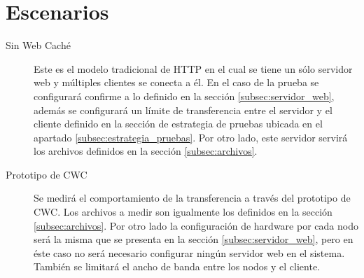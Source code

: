 \section{Escenarios}
\label{sec:escenarios}

\begin{description}
\item[Sin Web Caché] Este es el modelo tradicional de HTTP en el cual se tiene un sólo servidor web y múltiples clientes se conecta a él. En el caso de la prueba se configurará confirme a lo definido en la sección \ref{subsec:servidor_web}, además se configurará un límite de transferencia entre el servidor y el cliente definido en la sección de estrategia de pruebas ubicada en el apartado \ref{subsec:estrategia_pruebas}. Por otro lado, este servidor servirá los archivos definidos en la sección \ref{subsec:archivos}.

\item [Prototipo de CWC] Se medirá el comportamiento de la transferencia a través del prototipo de CWC. Los archivos a medir son igualmente los definidos en la sección  \ref{subsec:archivos}. Por otro lado la configuración de hardware por cada nodo será la misma que se presenta en la sección \ref{subsec:servidor_web}, pero en éste caso no será necesario configurar ningún servidor web en el sistema. También se limitará el ancho de banda entre los nodos y el cliente.
\end{description}
